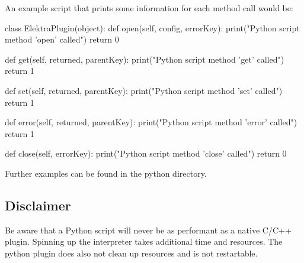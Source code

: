 An example script that prints some information for each method call would be\+: \begin{DoxyVerb}class ElektraPlugin(object):
    def open(self, config, errorKey):
        print("Python script method 'open' called")
        return 0

    def get(self, returned, parentKey):
        print("Python script method 'get' called")
        return 1

    def set(self, returned, parentKey):
        print("Python script method 'set' called")
        return 1

    def error(self, returned, parentKey):
        print("Python script method 'error' called")
        return 1

    def close(self, errorKey):
        print("Python script method 'close' called")
        return 0
\end{DoxyVerb}


Further examples can be found in the python directory.

\subsection*{Disclaimer}

Be aware that a Python script will never be as performant as a native C/\+C++ plugin. Spinning up the interpreter takes additional time and resources. The python plugin does also not clean up resources and is not restartable. 